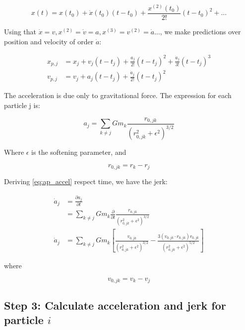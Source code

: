 \begin{appendixs}
	\begin{equation}
		x(t) = x(t_0) + \dot{x}(t_0)(t - t_0) + \frac{x^{(2)}(t_0)}{2!}(t - t_0)^2 + ...
	\end{equation}
	
	Using that $\dot{x} = v, x^{(2)} = \dot{v} = a, x^{(3)} = v^{(2)} = \dot{a} ...$, we make predictions over position and velocity of order $\dot{a}$:
	
	\begin{align}
		x_{p, j} &= x_j + v_j (t - t_j) + \frac{a_j}{2!} (t-t_j)^2 + \frac{\dot{a}_j}{3!} (t-t_j)^3 \\
		v_{p, j} &= v_j + a_j (t - t_j) + \frac{\dot{a}_j}{2!} (t-t_j)^2
	\end{align}
	
	The acceleration is due only to gravitational force. The expression for each particle j is:
	
	\begin{equation}
		a_j = \sum_{k \neq j} G m_k \frac{r_{0,jk}}{(r_{0,jk}^2 + \epsilon^2)^{3/2}} \label{eq:ap_accel}
	\end{equation}
	
	Where $\epsilon$ is the softening parameter, and
	
	\begin{equation}
		r_{0,jk} = r_{k} - r_{j}
	\end{equation}
	
	Deriving \ref{eq:ap_accel} respect time, we have the jerk:
	
	\begin{align}
		\dot{a}_j &= \frac{\partial a_j}{\partial t} \\
		&= \sum_{k \neq j} G m_k \frac{\partial}{\partial t}\frac{r_{0,jk}}{(r_{0,jk}^2 + \epsilon^2)^{3/2}} \\
		\dot{a}_j &= \sum_{k \neq j} G m_k \left[\frac{v_{0,jk}}{(r_{0,jk}^2 + \epsilon^2)^{3/2}} - \frac{3(v_{0,jk} \cdot r_{0,jk})r_{0,jk}}{(r_{0,jk}^2 + \epsilon^2)^{5/2}}\right] \label{eq:ap_jerk}
	\end{align}
	
	where
	
	\begin{equation}
		v_{0,jk} = v_{k} - v_{j}
	\end{equation}
	
	\subsection{Step 3: Calculate acceleration and jerk for particle $i$}
	

\end{appendixs}
